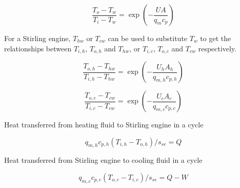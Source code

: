 \documentclass[review,3p,10t]{elsarticle}
\begin{document}
\begin{equation}
	\frac{T_o-T_w}{T_i-T_w}=\exp(-\frac{UA}{q_mc_p})
\end{equation}


%
%

For a Stirling engine, $T_{hw}$ or $T_{cw}$ can be used to substitute $T_w$ to get the relationships between $T_{i,h}$, $T_{o,h}$ and $T_{hw}$, or $T_{i,c}$, $T_{o,c}$ and $T_{cw}$ respectively.

\begin{equation}
	\frac{T_{o,h}-T_{hw}}{T_{i,h}-T_{hw}}=\exp(-\frac{U_hA_h}{q_{m,h}c_{p,h}})
	\label{Eq:T_h}
\end{equation}

\begin{equation}
	\frac{T_{o,c}-T_{cw}}{T_{i,c}-T_{cw}}=\exp(-\frac{U_cA_c}{q_{m,c}c_{p,c}})
	\label{Eq:T_c}
\end{equation}

Heat transferred from heating fluid to Stirling engine in a cycle

\begin{equation}
	q_{m,h}c_{p,h}(T_{i,h}-T_{o,h})/s_{se} = Q
	\label{Eq:q_h}
\end{equation}

Heat transferred from Stirling engine to cooling fluid in a cycle

\begin{equation}
	q_{m,c}c_{p,c}(T_{o,c}-T_{i,c})/s_{se} = Q - W
	\label{Eq:q_c}
\end{equation}

\end{document}
